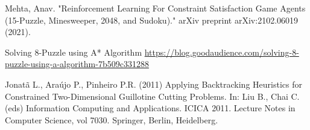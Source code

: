 \documentclass{svproc}
\begin{document}
\begin{thebibliography}{6}
		Mehta, Anav. "Reinforcement Learning For Constraint Satisfaction Game Agents (15-Puzzle, Minesweeper, 2048, and Sudoku)." arXiv preprint arXiv:2102.06019 (2021).
		
		Solving 8-Puzzle using A* Algorithm
		\url{https://blog.goodaudience.com/solving-8-puzzle-using-a-algorithm-7b509c331288}
		
		Jonatã L., Araújo P., Pinheiro P.R. (2011) Applying Backtracking Heuristics for Constrained Two-Dimensional Guillotine Cutting Problems. In: Liu B., Chai C. (eds) Information Computing and Applications. ICICA 2011. Lecture Notes in Computer Science, vol 7030. Springer, Berlin, Heidelberg.



		
	\end{thebibliography}
\end{document}
